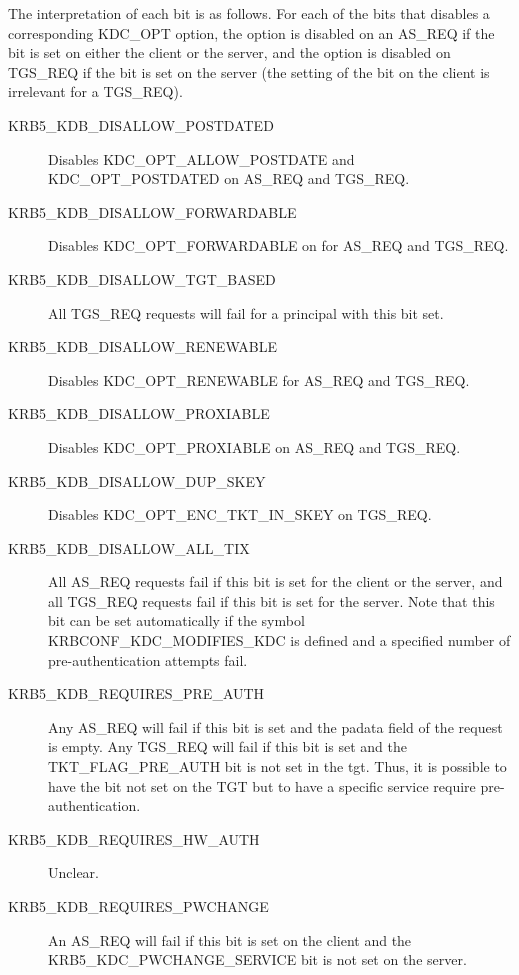 \begin{description}
The interpretation of each bit is as follows.  For each of the bits
that disables a corresponding KDC_OPT option, the option is disabled
on an AS_REQ if the bit is set on either the client or the server, and
the option is disabled on TGS_REQ if the bit is set on the server (the
setting of the bit on the client is irrelevant for a TGS_REQ).

\begin{description}
\item[KRB5_KDB_DISALLOW_POSTDATED]  Disables KDC_OPT_ALLOW_POSTDATE
and KDC_OPT_POSTDATED on AS_REQ and TGS_REQ.

\item[KRB5_KDB_DISALLOW_FORWARDABLE] Disables KDC_OPT_FORWARDABLE on
for AS_REQ and TGS_REQ.

\item[KRB5_KDB_DISALLOW_TGT_BASED] All TGS_REQ requests will fail for
a principal with this bit set.

\item[KRB5_KDB_DISALLOW_RENEWABLE] Disables KDC_OPT_RENEWABLE for
AS_REQ and TGS_REQ.  

\item[KRB5_KDB_DISALLOW_PROXIABLE] Disables KDC_OPT_PROXIABLE on
AS_REQ and TGS_REQ.

\item[KRB5_KDB_DISALLOW_DUP_SKEY] Disables KDC_OPT_ENC_TKT_IN_SKEY on
TGS_REQ.

\item[KRB5_KDB_DISALLOW_ALL_TIX] All AS_REQ requests fail if this bit
is set for the client or the server, and all TGS_REQ requests fail if
this bit is set for the server.  Note that this bit can be set
automatically if the symbol KRBCONF_KDC_MODIFIES_KDC is defined and a
specified number of pre-authentication attempts fail.

\item[KRB5_KDB_REQUIRES_PRE_AUTH] Any AS_REQ will fail if this bit is
set and the padata field of the request is empty.  Any TGS_REQ will
fail if this bit is set and the TKT_FLAG_PRE_AUTH bit is not set in
the tgt.  Thus, it is possible to have the bit not set on the TGT but
to have a specific service require pre-authentication.

\item[KRB5_KDB_REQUIRES_HW_AUTH] Unclear.

\item[KRB5_KDB_REQUIRES_PWCHANGE] An AS_REQ will fail if this bit is
set on the client and the KRB5_KDC_PWCHANGE_SERVICE bit is not set on
the server.


\end{description}
\end{description}

